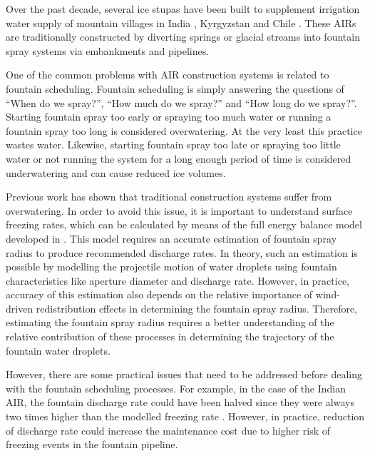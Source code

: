 \documentclass[tc, manuscript]{copernicus}
\begin{document}
Over the past decade, several ice stupas have been built to supplement irrigation water supply of mountain
villages in India \citep{wangchukIceStupaCompetition2020, palmerStoringFrozenWater2022,
aggarwalAdaptationClimateChange2021}, Kyrgyzstan \citep{bbcnewsBrightArtificialGlacier2020} and Chile
\citep{reutersConservationistsChileAim2021}. These AIRs are traditionally constructed by diverting springs or
glacial streams into fountain spray systems via embankments and pipelines. 

One of the common problems with AIR construction systems is related to fountain scheduling. Fountain scheduling
is simply answering the questions of “When do we spray?”, “How much do we spray?” and “How long do we spray?”.
Starting fountain spray too early or spraying too much water or running a fountain spray too long is considered
overwatering. At the very least this practice wastes water.  Likewise, starting fountain spray too late or
spraying too little water or not running the system for a long enough period of time is considered underwatering
and can cause reduced ice volumes.

Previous work \citep{balasubramanianInfluenceMeteorologicalConditions2022} has shown that traditional
construction systems suffer from overwatering. In order to avoid this issue, it is important to understand
surface freezing rates, which can be calculated by means of the full energy balance model developed in
\cite{balasubramanianInfluenceMeteorologicalConditions2022}. This model requires an accurate estimation of
fountain spray radius to produce recommended discharge rates. In theory, such an estimation is possible by
modelling the projectile motion of water droplets using fountain characteristics like aperture diameter and
discharge rate. However, in practice, accuracy of this estimation also depends on the relative importance of
wind-driven redistribution effects in determining the fountain spray radius. Therefore, estimating the fountain
spray radius requires a better understanding of the relative contribution of these processes in determining the
trajectory of the fountain water droplets.

However, there are some practical issues that need to be addressed before dealing with the fountain scheduling
processes. For example, in the case of the Indian AIR, the fountain discharge rate could have been halved since
they were always two times higher than the modelled freezing rate
\citep{balasubramanianInfluenceMeteorologicalConditions2022}. However, in practice, reduction of discharge rate
could increase the maintenance cost due to higher risk of freezing events in the fountain pipeline.
\end{document}
